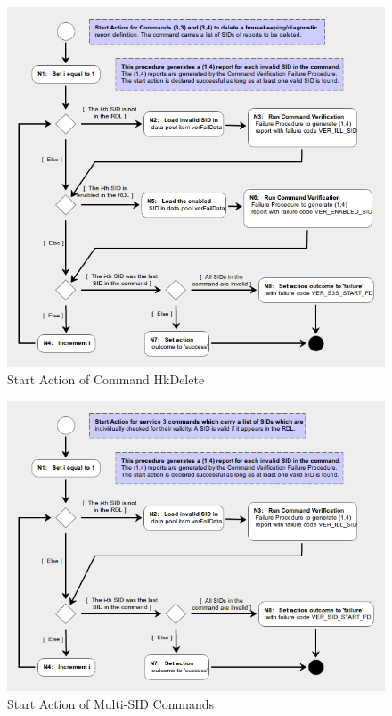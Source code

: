 \documentclass[a4paper,10pt]{article}
\begin{document}
\begin{figure}[H]
 \centering
 \includegraphics[scale=0.55,keepaspectratio=true]{CrPsCmd3s3Start.png}
 \caption{Start Action of Command HkDelete}
 \label{fig:Cmd3s3Start}
\end{figure}

\begin{figure}[H]
 \centering
 \includegraphics[scale=0.55,keepaspectratio=true]{CrPsCmd3SidStart.png}
 \caption{Start Action of Multi-SID Commands}
 \label{fig:Cmd3SidStart}
\end{figure}
\end{document}
